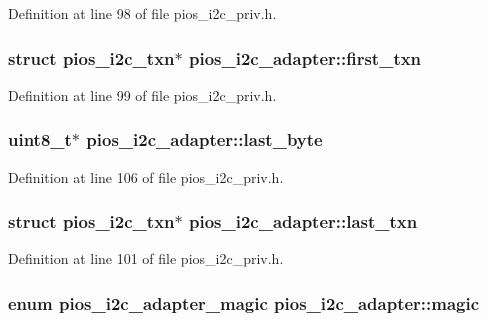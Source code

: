 \-Definition at line 98 of file pios\-\_\-i2c\-\_\-priv.\-h.

\hypertarget{structpios__i2c__adapter_ad98b03cc641fe33909c19a8e96cb64d5}{
\subsubsection[{first\-\_\-txn}]{\setlength{\rightskip}{0pt plus 5cm}struct {\bf pios\-\_\-i2c\-\_\-txn}$\ast$ {\bf pios\-\_\-i2c\-\_\-adapter\-::first\-\_\-txn}}}\label{structpios__i2c__adapter_ad98b03cc641fe33909c19a8e96cb64d5}


\-Definition at line 99 of file pios\-\_\-i2c\-\_\-priv.\-h.

\hypertarget{structpios__i2c__adapter_a09797c133013f2126da829410d1df0c0}{
\subsubsection[{last\-\_\-byte}]{\setlength{\rightskip}{0pt plus 5cm}uint8\-\_\-t$\ast$ {\bf pios\-\_\-i2c\-\_\-adapter\-::last\-\_\-byte}}}\label{structpios__i2c__adapter_a09797c133013f2126da829410d1df0c0}


\-Definition at line 106 of file pios\-\_\-i2c\-\_\-priv.\-h.

\hypertarget{structpios__i2c__adapter_af283735c4934e46748f2461bf338811e}{
\subsubsection[{last\-\_\-txn}]{\setlength{\rightskip}{0pt plus 5cm}struct {\bf pios\-\_\-i2c\-\_\-txn}$\ast$ {\bf pios\-\_\-i2c\-\_\-adapter\-::last\-\_\-txn}}}\label{structpios__i2c__adapter_af283735c4934e46748f2461bf338811e}


\-Definition at line 101 of file pios\-\_\-i2c\-\_\-priv.\-h.

\hypertarget{structpios__i2c__adapter_a07891f689e89b36732affa16c1c3bf94}{
\subsubsection[{magic}]{\setlength{\rightskip}{0pt plus 5cm}enum {\bf pios\-\_\-i2c\-\_\-adapter\-\_\-magic} {\bf pios\-\_\-i2c\-\_\-adapter\-::magic}}}\label{structpios__i2c__adapter_a07891f689e89b36732affa16c1c3bf94}


